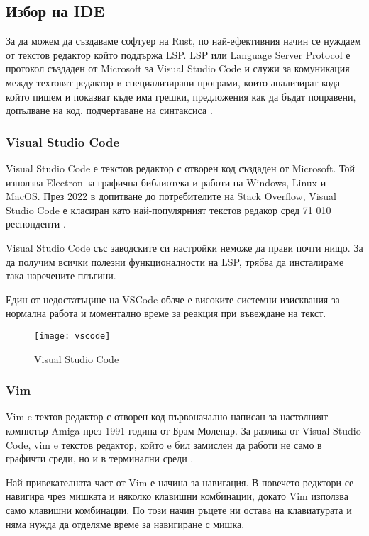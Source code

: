 \subsection{Избор на IDE}
За да можем да създаваме софтуер на Rust, по най-ефективния начин се нуждаем от
текстов редактор който поддържа LSP. LSP или Language Server Protocol е
протокол създаден от Microsoft за Visual Studio Code и служи за комуникация
между техтовят редактор и специализирани програми, които анализират кода който
пишем и показват къде има грешки, предложения как да бъдат поправени, допълване
на код, подчертаване на синтаксиса \cite{lsp_wikipedia}.

\subsubsection{Visual Studio Code}
Visual Studio Code е текстов редактор с отворен код създаден от Microsoft. Той
използва Electron за графична библиотека и работи на Windows, Linux и MacOS. 
През 2022 в допитване до потребителите на Stack Overflow, Visual Studio Code е
класиран като най-популярният текстов редакор сред 71 010 респонденти
\cite{vscode_wikipedia}.

Visual Studio Code със заводските си настройки неможе да прави почти нищо. За
да получим всички полезни функционалности на LSP, трябва да инсталираме така
наречените плъгини.

Един от недостатъцине на VSCode обаче е високите системни изисквания за
нормална работа и моментално време за реакция при въвеждане на текст.
\begin{figure}[!htb]
  \texttt{[image: vscode]}
  \centering
  \caption{Visual Studio Code}
  \label{fig:vscode}
\end{figure}

\subsubsection{Vim}
Vim e техтов редактор с отворен код първоначално написан за настолният компютър
Amiga през 1991 година от Брам Моленар. За разлика от
Visual Studio Code, vim e текстов редактор, който e бил замислен да работи не
само в графичти среди, но и в терминални среди \cite{vim_wikipedia}. 

Най-привекателната част от Vim е начина за навигация. В повечето редктори се
навигира чрез мишката и няколко клавишни комбинации, докато Vim използва само
клавишни комбинации. По този начин ръцете ни остава на клавиатурата и няма
нужда да отделяме време за навигиране с мишка. 

